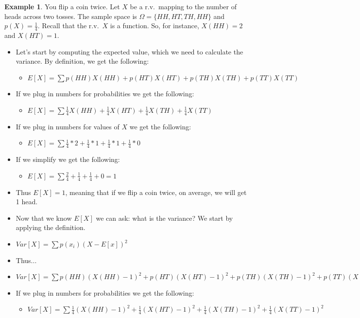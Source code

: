 \documentclass[]{article}
\theoremstyle{definition}
\newtheorem{exmp}{Example}[section]
\begin{document}
\begin{exmp}
You flip a coin twice. Let $X$ be a r.v.\ mapping to the number of heads across two tosses. The sample space is $\Omega=\{HH,HT,TH,HH\}$ and $p(X) = \frac{1}{4}$. Recall that the r.v.\ $X$ is a function. So, for instance, $X(HH)=2$ and $X(HT)=1$. 
\begin{itemize}
\item Let's start by computing the expected value, which we need to calculate the variance. By definition, we get the following:
	\begin{itemize}
	\item[] $E[X] = \sum p(HH)X(HH) + p(HT)X(HT) +  p(TH)X(TH) + p(TT)X(TT)$
	\end{itemize}
\item If we plug in numbers for probabilities we get the following:
  \begin{itemize}
    \item[] $E[X] = \sum \frac{1}{4} X(HH) + \frac{1}{4} X(HT) +\frac{1}{4} X(TH)+ \frac{1}{4} X(TT)$
   \end{itemize}
\item If we plug in numbers for values of $X$ we get the following:
  \begin{itemize}
	\item[] $E[X] = \sum \frac{1}{4} * 2 + \frac{1}{4} * 1 +\frac{1}{4}* 1 + \frac{1}{4} * 0$
   \end{itemize}
\item If we simplify we get the following:
  	\begin{itemize}
		\item[] $E[X] = \sum \frac{2}{4} + \frac{1}{4} +\frac{1}{4} + 0 = 1$
	\end{itemize}
\item Thus $E[X]=1$, meaning that if we flip a coin twice, on average, we will get 1 head.
\item Now that we know $E[X]$ we can ask: what is the variance? We start by applying the definition.
\item $Var[X] = \sum p(x_i) (X - E[x])^2$
\item Thus... 
\item $Var[X] = \sum p(HH)(X(HH) -1)^2 + p(HT)(X(HT) -1)^2 +  p(TH)(X(TH) -1)^2 + p(TT)(X(TT) -1)^2$
\item If we plug in numbers for probabilities we get the following:
  \begin{itemize}
    \item[] $Var[X] =  \sum \frac{1}{4} (X(HH) -1)^2 +  \frac{1}{4} (X(HT) -1)^2 +   \frac{1}{4}(X(TH) -1)^2 +  \frac{1}{4}(X(TT) -1)^2$

\end{itemize}
\end{itemize}
\end{exmp}
\end{document}
